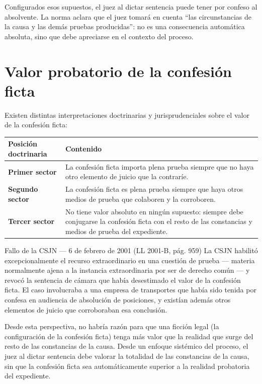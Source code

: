 \documentclass[12pt,oneside]{book}
\renewcommand{\arraystretch}{1.15}
\begin{document}
Configurados esos supuestos, el juez al dictar sentencia puede tener por confeso al absolvente. La norma aclara que el juez tomará en cuenta ``las circunstancias de la causa y las demás pruebas producidas'': no es una consecuencia automática absoluta, sino que debe apreciarse en el contexto del proceso.

\section{Valor probatorio de la confesión ficta}

Existen distintas interpretaciones doctrinarias y jurisprudenciales sobre el valor de la confesión ficta:

\begin{center}
\renewcommand{\arraystretch}{1.3}
\begin{tabularx}{\textwidth}{
    >{\raggedright\arraybackslash}p{}
    >{\raggedright\arraybackslash}X}
\toprule
\textbf{Posición doctrinaria} & \textbf{Contenido} \\
\midrule
\textbf{Primer sector} & La confesión ficta importa plena prueba siempre que no haya otro elemento de juicio que la contraríe. \\
\addlinespace
\textbf{Segundo sector} & La confesión ficta es plena prueba siempre que haya otros medios de prueba que colaboren y la corroboren. \\
\addlinespace
\textbf{Tercer sector} & No tiene valor absoluto en ningún supuesto: siempre debe conjugarse la confesión ficta con el resto de las constancias y medios de prueba del expediente. \\
\bottomrule
\end{tabularx}
\end{center}

\begin{norma}{Fallo de la CSJN --- 6 de febrero de 2001 (LL 2001-B, pág. 959)}
La CSJN habilitó excepcionalmente el recurso extraordinario en una cuestión de prueba --- materia normalmente ajena a la instancia extraordinaria por ser de derecho común --- y revocó la sentencia de cámara que había desestimado el valor de la confesión ficta. El caso involucraba a una empresa de transportes que había sido tenida por confesa en audiencia de absolución de posiciones, y existían además otros elementos de juicio que corroboraban esa conclusión.
\end{norma}

Desde esta perspectiva, no habría razón para que una ficción legal (la configuración de la confesión ficta) tenga más valor que la realidad que surge del resto de las constancias de la causa. Desde un enfoque sistémico del proceso, el juez al dictar sentencia debe valorar la totalidad de las constancias de la causa, sin que la confesión ficta sea automáticamente superior a la realidad probatoria del expediente.
\end{document}
